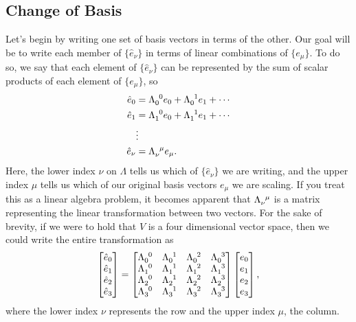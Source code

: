 \subsection{Change of Basis}
Let's begin by writing one set of basis vectors in terms of the other.
Our goal will be to write each member of $\{\hat{e}_\nu\}$ in terms of linear combinations of $\{e_\mu\}$.
To do so, we say that each element of $\{\hat{e}_\nu\}$ can be represented by the sum of scalar products of each element of $\{e_\mu\}$, so
\begin{align*}
    \hat{e}_0 &= \tensor{\Lambda}{_0^0}e_0 + \tensor{\Lambda}{_0^1}e_1 + \cdots \\
    \hat{e}_1 &= \tensor{\Lambda}{_1^0}e_0 + \tensor{\Lambda}{_1^1}e_1 + \cdots \\
    &\vdots \\
    \hat{e}_\nu &= \tensor{\Lambda}{_\nu^\mu}e_\mu.
\end{align*}
Here, the lower index $\nu$ on $\Lambda$ tells us which of $\{\hat{e}_\nu\}$ we are writing, and the upper index $\mu$ tells us which of our original basis vectors $e_\mu$ we are scaling.
If you treat this as a linear algebra problem, it becomes apparent that $\tensor{\Lambda}{_\nu^\mu}$ is a matrix representing the linear transformation between two vectors.
For the sake of brevity, if we were to hold that $V$ is a four dimensional vector space, then we could write the entire transformation as
\[
    \begin{bmatrix}
        \hat{e}_0 \\
        \hat{e}_1 \\
        \hat{e}_2 \\
        \hat{e}_3
    \end{bmatrix} = 
    \begin{bmatrix}
        \tensor{\Lambda}{_0^0} & \tensor{\Lambda}{_0^1} & \tensor{\Lambda}{_0^2} & \tensor{\Lambda}{_0^3} \\
        \tensor{\Lambda}{_1^0} & \tensor{\Lambda}{_1^1} & \tensor{\Lambda}{_1^2} & \tensor{\Lambda}{_1^3} \\
        \tensor{\Lambda}{_2^0} & \tensor{\Lambda}{_2^1} & \tensor{\Lambda}{_2^2} & \tensor{\Lambda}{_2^3} \\
        \tensor{\Lambda}{_3^0} & \tensor{\Lambda}{_3^1} & \tensor{\Lambda}{_3^2} & \tensor{\Lambda}{_3^3}
    \end{bmatrix}
    \begin{bmatrix}
        e_0 \\
        e_1 \\
        e_2 \\
        e_3
    \end{bmatrix},
\]
where the lower index $\nu$ represents the row and the upper index $\mu$, the column.

